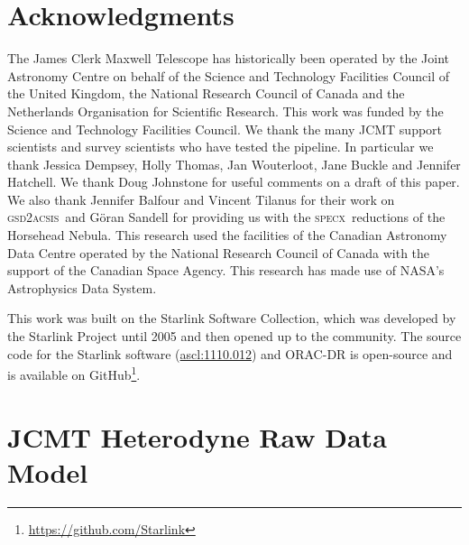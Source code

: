 \documentclass[a4paper,fleqn,usenatbib]{mnras}
\newcommand{\specx}{\textsc{specx}}
\newcommand{\gsdacsis}{\textsc{gsd{\footnotesize{2}}acsis}}
\newcommand{\ascl}[1]{\href{http://www.ascl.net/#1}{ascl:#1}}
\begin{document}
\section*{Acknowledgments}

The James Clerk Maxwell Telescope has historically been operated by
the Joint Astronomy Centre on behalf of the Science and Technology
Facilities Council of the United Kingdom, the National Research
Council of Canada and the Netherlands Organisation for Scientific
Research. This work was funded by the Science and Technology Facilities
Council. We thank the many JCMT support scientists and survey
scientists who have tested the pipeline. In particular we thank
Jessica Dempsey, Holly Thomas, Jan Wouterloot, Jane Buckle and
Jennifer Hatchell. We thank Doug Johnstone for useful comments on a
draft of this paper. We also thank Jennifer Balfour and
Vincent Tilanus for their work on \gsdacsis\ and
G\"{o}ran Sandell for providing us with the \specx\ reductions of the Horsehead
Nebula. This research used the facilities of the Canadian Astronomy
Data Centre operated by the National Research Council of Canada with
the support of the Canadian Space Agency. This research has made use
of NASA's Astrophysics Data System.

This work was built on the Starlink Software Collection, which was
developed by the Starlink Project until 2005
\citep{1982QJRAS..23..485D,2005ASPC..347...22D,2008ASPC..394..650C}
and then opened up to the community. The source code for the Starlink
software (\ascl{1110.012}) and ORAC-DR is open-source and is
available on GitHub\footnote{\url{https://github.com/Starlink}}.

\appendix

\section{JCMT Heterodyne Raw Data Model}
\label{sec:rawdata}
\end{document}

